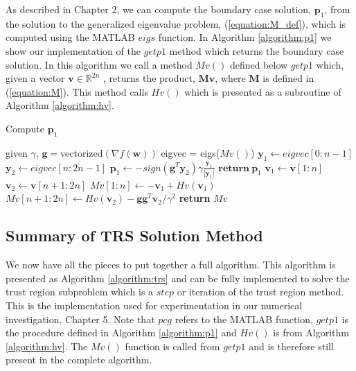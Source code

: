 \documentclass[letterpaper,12pt,titlepage,oneside,final]{book}
\begin{document}
	As described in Chapter 2, we can compute the boundary case solution, $\mathbf{p}_{1}$, from the solution to the generalized eigenvalue problem, (\ref{equation:M_def}), which is computed using the MATLAB $eigs$ function. In Algorithm \ref{algorithm:p1} we show our implementation of the $getp1$ method which returns the boundary case solution. In this algorithm we call a method $Mv()$ defined below $getp1$ which, given a vector $\mathbf{v} \in \mathbb{R}^{2n}$ , returns the product, $\mathbf{Mv}$, where $\mathbf{M}$ is defined in (\ref{equation:M}). This method calls $Hv()$ which is presented as a subroutine of Algorithm \ref{algorithm:hv}.
	
	\begin{algorithm}
		\caption{Compute $\mathbf{p}_{1}$}
		\begin{algorithmic}[1]
		\State given $\gamma$, $\mathbf{g} = $vectorized$(\nabla{f(\mathbf{w})})$
		\State eigvec = eigs($Mv()$)
		\State $\mathbf{y}_{1} \gets \textit{eigvec}[0:n-1]$
		\State $\mathbf{y}_{2} \gets \textit{eigvec}[n:2n-1]$
		\State $\mathbf{p}_{1} \gets -sign(\mathbf{g}^{T}\mathbf{y}_{2}) \gamma \frac{\mathbf{y}_{1}}{|\mathbf{y}_{1}|}$
		\State $\textbf{return} \ \mathbf{p}_{1}$ 
		\EndProcedure
		\State $\mathbf{v}_{1} \gets \mathbf{v}[1:n]$
		\State $\mathbf{v}_{2} \gets \mathbf{v}[n+1:2n]$
		\State $Mv[1:n] \gets -\mathbf{v}_{1} + Hv(\mathbf{v}_{1})$  
		\State $Mv[n+1:2n] \gets Hv(\mathbf{v}_{2}) - \mathbf{g}\mathbf{g}^{T}\mathbf{v}_{2}/\gamma^{2}$
		\State \textbf{return} $Mv$ 
		\EndProcedure
	\end{algorithmic}
	\label{algorithm:p1}
	\end{algorithm}  
	
	\subsection{Summary of TRS Solution Method}

	We now have all the pieces to put together a full algorithm. This algorithm is presented as Algorithm \ref{algorithm:trs} and can be fully implemented to solve the trust region subproblem \cite{adachi.paper} which is a $step$ or iteration of the trust region method. This is the implementation used for experimentation in our numerical investigation, Chapter 5. Note that $pcg$ refers to the MATLAB function, $getp1$ is the procedure defined in Algorithm \ref{algorithm:p1} and $Hv()$ is from Algorithm \ref{algorithm:hv}. The $Mv()$ function is called from $getp1$ and is therefore still present in the complete algorithm.  
	
\end{document}
